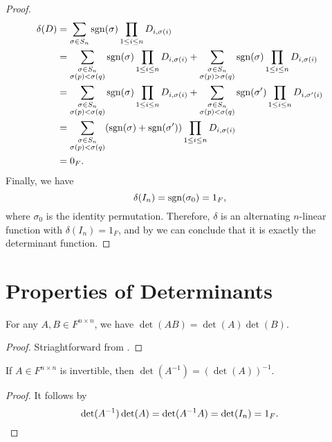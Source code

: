\begin{proof}
  \begin{align*}
    \delta(D)
    &= \sum_{\sigma \in S_n} \operatorname{sgn}(\sigma)
    \prod_{1 \leq i \leq n} D_{i,\sigma(i)} \\
    &= \sum_{\substack{\sigma \in S_n \\ \sigma(p) < \sigma(q)}} \operatorname{sgn}(\sigma)
    \prod_{1 \leq i \leq n} D_{i,\sigma(i)}
    + \sum_{\substack{\sigma \in S_n \\ \sigma(p) > \sigma(q)}} \operatorname{sgn}(\sigma)
    \prod_{1 \leq i \leq n} D_{i,\sigma(i)} \\
    &= \sum_{\substack{\sigma \in S_n \\ \sigma(p) < \sigma(q)}} \operatorname{sgn}(\sigma)
    \prod_{1 \leq i \leq n} D_{i,\sigma(i)}
    + \sum_{\substack{\sigma \in S_n \\ \sigma(p) < \sigma(q)}} \operatorname{sgn}(\sigma')
    \prod_{1 \leq i \leq n} D_{i,\sigma'(i)} \\
    &= \sum_{\substack{\sigma \in S_n \\ \sigma(p) < \sigma(q)}}
    (\operatorname{sgn}(\sigma) + \operatorname{sgn}(\sigma')) \prod_{1 \leq i \leq n} D_{i,\sigma(i)} \\
    &= 0_F.
  \end{align*}
  Finally, we have
  \begin{equation*}
    \delta(I_n) = \operatorname{sgn}(\sigma_0) = 1_F,
  \end{equation*}
  where $\sigma_0$ is the identity permutation.
  Therefore, $\delta$ is an alternating $n$-linear function with
  $\delta(I_n) = 1_F$, and by  we can conclude
  that it is exactly the determinant function.
\end{proof}

\section{Properties of Determinants}
\begin{theorem}
  For any $A, B \in F^{n \times n}$, we have $\det(AB) = \det(A)\det(B)$.
\end{theorem}
\begin{proof}
  Striaghtforward from .
\end{proof}

\begin{theorem}
  If $A \in F^{n \times n}$ is invertible, then $\det(A^{-1}) =
  (\det(A))^{-1}$.
\end{theorem}
\begin{proof}
  It follows by
  \begin{equation*}
    \det(A^{-1})\det(A)
    = \det(A^{-1}A)
    = \det(I_n)
    = 1_F.
    \qedhere
  \end{equation*}
\end{proof}

